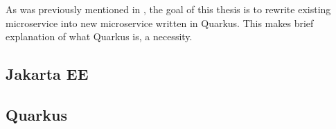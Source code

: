 \documentclass[../main.tex]{subfiles}
\begin{document}
As was previously mentioned in , the goal of this thesis is to rewrite existing microservice into new microservice written in Quarkus. This makes brief explanation of what Quarkus is, a necessity.

\subsection*{Jakarta EE}


\subsection*{Quarkus}

\end{document}
